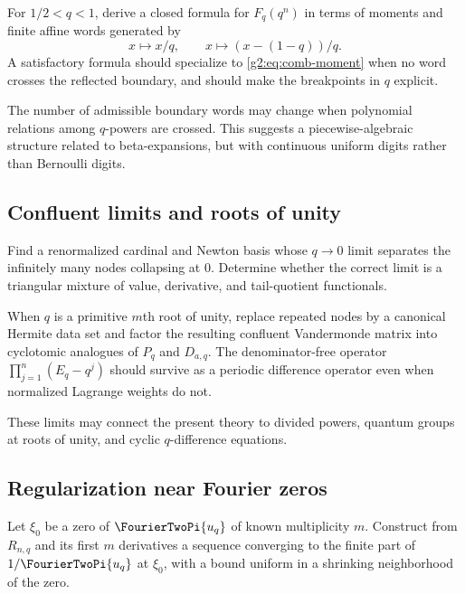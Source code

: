 \begin{problem}
\label{g2:prob:qgt-half}
For $1/2<q<1$, derive a closed formula for $F_q(q^n)$ in terms of moments and
finite affine words generated by
\[
 x\mapsto x/q,
 \qquad
 x\mapsto(x-(1-q))/q.
\]
A satisfactory formula should specialize to \eqref{g2:eq:comb-moment} when no
word crosses the reflected boundary, and should make the breakpoints in $q$
explicit.
\end{problem}

The number of admissible boundary words may change when polynomial relations
among $q$-powers are crossed.  This suggests a piecewise-algebraic structure
related to beta-expansions, but with continuous uniform digits rather than
Bernoulli digits.

\subsection{Confluent limits and roots of unity}

\begin{problem}
\label{g2:prob:q0-confluent}
Find a renormalized cardinal and Newton basis whose $q\to0$ limit separates the
infinitely many nodes collapsing at $0$.  Determine whether the correct limit
is a triangular mixture of value, derivative, and tail-quotient functionals.
\end{problem}

\begin{problem}
\label{g2:prob:roots-unity}
When $q$ is a primitive $m$th root of unity, replace repeated nodes by a
canonical Hermite data set and factor the resulting confluent Vandermonde
matrix into cyclotomic analogues of $P_q$ and $D_{a,q}$.  The denominator-free
operator
$\prod_{j=1}^n(E_q-q^j)$ should survive as a periodic difference operator even
when normalized Lagrange weights do not.
\end{problem}

These limits may connect the present theory to divided powers, quantum groups
at roots of unity, and cyclic $q$-difference equations.

\subsection{Regularization near Fourier zeros}

\begin{problem}
\label{g2:prob:zero-regularization}
Let $\xi_0$ be a zero of $\FourierTwoPi{u_q}$ of known multiplicity $m$.  Construct
from $R_{n,q}$ and its first $m$ derivatives a sequence converging to the
finite part of $1/\FourierTwoPi{u_q}$ at $\xi_0$, with a bound uniform in a shrinking
neighborhood of the zero.
\end{problem}

